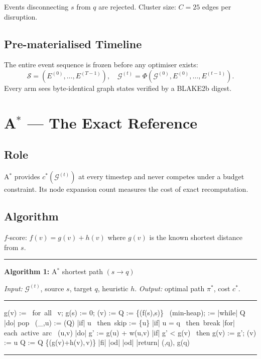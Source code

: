 \documentclass[11pt,a4paper]{article}
\theoremstyle{definition}
\newcommand{\calG}{\mathcal{G}}
\begin{document}
Events disconnecting $s$ from $q$ are rejected.  Cluster size: $C=25$ edges per
disruption.

\subsection{Pre-materialised Timeline}

The entire event sequence is frozen before any optimiser exists:
\[
  \mathcal{S} = (E^{(0)},\ldots,E^{(T-1)}),\quad
  \calG^{(t)} = \Phi(\calG^{(0)},E^{(0)},\ldots,E^{(t-1)}).
\]
Every arm sees byte-identical graph states verified by a BLAKE2b digest.

\section{A$^*$ --- The Exact Reference}
\label{sec:astar}

\subsection{Role}

A$^*$ provides $c^*(\calG^{(t)})$ at every timestep and never competes under a budget
constraint.  Its node expansion count measures the cost of exact recomputation.

\subsection{Algorithm}

$f$-score: $f(v) = g(v) + h(v)$ where $g(v)$ is the known shortest distance from $s$.

\begin{center}
\begin{minipage}{0.88\linewidth}
\hrule\medskip
\textbf{Algorithm 1:} A$^*$ shortest path $(s\to q)$

\smallskip\textit{Input:} $\calG^{(t)}$, source $s$, target $q$, heuristic $h$.
\textit{Output:} optimal path $\pi^*$, cost $c^*$.
\hrule\medskip
\begin{program}
g(v) := \infty \mbox{ for all } v;\; g(s) := 0;\; (v) := 
Q := \{(f(s),s)\} \mbox{ (min-heap)};\;  := \emptyset
|while| Q \ne \emptyset |do|
  \mbox{pop } (\_,u) := (Q)
  |if| u \in {} \mbox{ then skip}
   :=  \cup \{u\}
  |if| u = q \mbox{ then break}
  |for| \mbox{each active arc } (u,v) |do|
    g' := g(u) + w(u,v)
    |if| g' < g(v) \mbox{ then}
      g(v) := g';\; (v) := u
      Q := Q \cup \{(g(v)+h(v),\,v)\}
    |fi|
  |od|
|od|
|return| (,q),\; g(q)
\end{program}
\hrule
\end{minipage}
\end{center}
\end{document}
